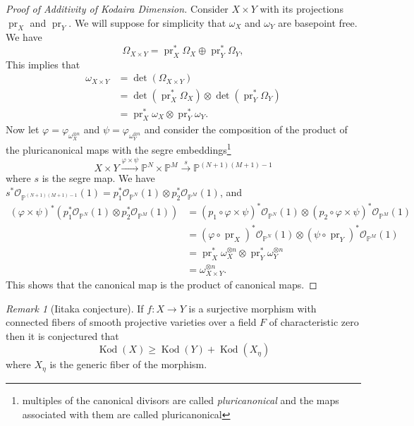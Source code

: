 \documentclass[12pt]{article}
\numberwithin{equation}{section}
\theoremstyle{definition}
\theoremstyle{remark}
\newtheorem{remark}[theorem]{Remark}
\newcommand{\Ocal}{\mathcal{O}}
\newcommand{\PP}{\mathbb{P}}
\newcommand{\pr}{\operatorname{pr}}
\newcommand{\kod}{\operatorname{Kod}}
\begin{document}
\begin{proof}[Proof of Additivity of Kodaira Dimension]
Consider $X\times Y$ with its projections $\pr_X$ and $\pr_Y$. 
We will suppose for simplicity that $\omega_X$ and $\omega_Y$ are basepoint free. 
We have 
 $$ \Omega_{X\times Y} = \pr_X^*\Omega_X\oplus \pr_Y^*\Omega_Y, $$
This implies that 
\begin{align*}
\omega_{X\times Y} &= \det(\Omega_{X\times Y}) \\
&= \det(\pr_X^*\Omega_X) \otimes \det(\pr_Y^*\Omega_Y) \\
&=\pr_X^*\omega_X \otimes \pr_Y^*\omega_Y.
\end{align*}
Now let $\varphi = \varphi_{\omega_X^{\otimes n}}$ and $\psi = \varphi_{\omega_Y^{\otimes n}}$ and consider the composition of the product of the pluricanonical maps with the segre embeddings\footnote{multiples of the canonical divisors are called \emph{pluricanonical} and the maps associated with them are called pluricanonical}
 $$ X\times Y \xrightarrow{\varphi \times \psi } \PP^N\times\PP^M \xrightarrow{s}\PP^{(N+1)(M+1)-1}$$
where $s$ is the segre map.
We have $s^*\Ocal_{\PP^{(N+1)(M+1)-1}}(1)  = p_1^*\Ocal_{\PP^N}(1)\otimes p_2^*\Ocal_{\PP^M}(1)$,
and 
\begin{align*}
 (\varphi\times\psi)^*(p_1^*\Ocal_{\PP^N}(1)\otimes p_2^*\Ocal_{\PP^M}(1))
 &= (p_1\circ \varphi\times \psi)^*\Ocal_{\PP^N}(1) \otimes (p_2\circ \varphi\times \psi)^*\Ocal_{\PP^M}(1) \\
 &=(\varphi \circ \pr_X)^*\Ocal_{\PP^N}(1) \otimes (\psi\circ \pr_Y)^*\Ocal_{\PP^M}(1) \\
 &= \pr_X^*\omega_X^{\otimes n} \otimes \pr_Y^*\omega_Y^{\otimes n} \\
 &= \omega_{X\times Y}^{\otimes n}.
\end{align*}
This shows that the canonical map is the product of canonical maps. 
\end{proof}

\begin{remark}[Iitaka conjecture]
	If $f:X\to Y$ is a surjective morphism with connected fibers of smooth projective varieties over a field $F$ of characteristic zero then it is conjectured that
	 $$ \kod(X) \geq \kod(Y) + \kod(X_{\eta}) $$
	where $X_{\eta}$ is the generic fiber of the morphism.
\end{remark}
\end{document}
